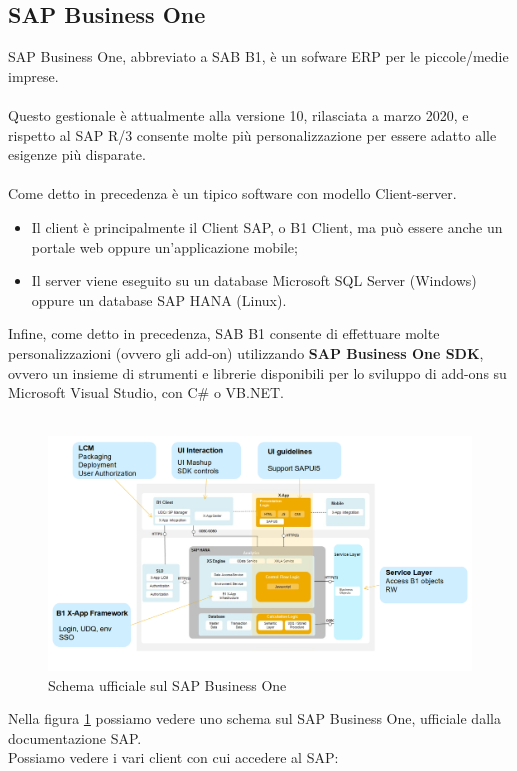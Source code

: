 \subsection{SAP Business One}
SAP Business One, abbreviato a SAB B1, è un sofware ERP per le piccole/medie imprese.
\\\\Questo gestionale è attualmente alla versione 10, rilasciata a marzo 2020, e rispetto al SAP R/3 consente molte più personalizzazione per essere adatto alle esigenze più disparate.
\\\\Come detto in precedenza è un tipico software con modello Client-server.
\begin{itemize}
	\item Il client è principalmente il Client SAP, o B1 Client, ma può essere anche un portale web oppure un'applicazione mobile;
	\item Il server viene eseguito su un database Microsoft SQL Server (Windows) oppure un database SAP HANA (Linux).\\
\end{itemize}
Infine, come detto in precedenza, SAB B1 consente di effettuare molte personalizzazioni (ovvero gli add-on) utilizzando \textbf{SAP Business One SDK}, ovvero un insieme di strumenti e librerie disponibili per lo sviluppo di add-ons su Microsoft Visual Studio, con C\# o VB.NET.\\\\
\begin{figure}[!h] 
	\includegraphics[scale = 0.4, left]{immagini/erp-sap-inside.png} 
	\caption{Schema ufficiale sul SAP Business One}
	\label{fig:2-3}
\end{figure}
\newpage
\begin{flushleft}
	Nella figura \ref{fig:2-3} possiamo vedere uno schema sul SAP Business One, ufficiale dalla documentazione SAP.\\
	Possiamo vedere i vari client con cui accedere al SAP:
\end{flushleft}

